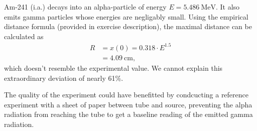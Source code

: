 Am-241 (i.a.) decays into an alpha-particle of energy $E=\SI{5.486}{\mega\electronvolt}$.
It also emits gamma particles whose energies are negligably small.
Using the empirical distance formula (provided in exercise description), the maximal distance can be calculated as
\begin{align*}
	R &= x(0) = \num{0.318}\cdot E^{\num{1.5}} \\
	&=\SI{4.09}{\centi\meter},
\end{align*}
which doesn't resemble the experimental value.
We cannot explain this extraordinary deviation of nearly \num{61}\%.

The quality of the experiment could have benefitted by condcucting a reference experiment with a sheet of paper between tube and source, preventing the alpha radiation from reaching the tube to get a baseline reading of the emitted gamma radiation.
